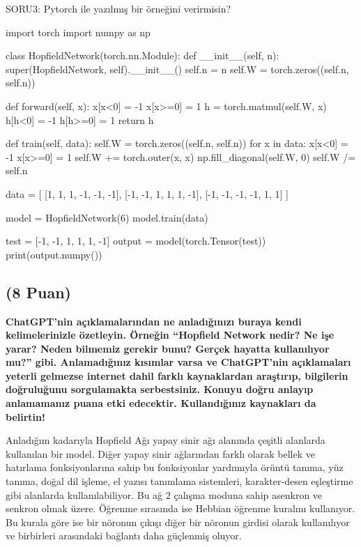 \documentclass[11pt]{article}
\begin{document}
SORU3: Pytorch ile yazılmış bir örneğini verirmisin?

\begin{python}
import torch
import numpy as np

class HopfieldNetwork(torch.nn.Module):
    def __init__(self, n):
        super(HopfieldNetwork, self).__init__()
        self.n = n
        self.W = torch.zeros((self.n, self.n))
        
    def forward(self, x):
        x[x<0] = -1
        x[x>=0] = 1
        h = torch.matmul(self.W, x)
        h[h<0] = -1
        h[h>=0] = 1
        return h
        
    def train(self, data):
        self.W = torch.zeros((self.n, self.n))
        for x in data:
            x[x<0] = -1
            x[x>=0] = 1
            self.W += torch.outer(x, x)
        np.fill_diagonal(self.W, 0)
        self.W /= self.n
        
data = [
    [1, 1, 1, -1, -1, -1],
    [-1, -1, 1, 1, 1, -1],
    [-1, -1, -1, -1, 1, 1]
]

model = HopfieldNetwork(6)
model.train(data)

test = [-1, -1, 1, 1, 1, -1]
output = model(torch.Tensor(test))
print(output.numpy())

\end{python}




\subsection{(8 Puan)} \textbf{ChatGPT’nin açıklamalarından ne anladığınızı buraya kendi kelimelerinizle özetleyin. Örneğin ``Hopfield Network nedir? Ne işe yarar? Neden bilmemiz gerekir bunu? Gerçek hayatta kullanılıyor mu?'' gibi. Anlamadığınız kısımlar varsa ve ChatGPT’nin açıklamaları yeterli gelmezse internet dahil farklı kaynaklardan araştırıp, bilgilerin doğruluğunu sorgulamakta serbestsiniz. Konuyu doğru anlayıp anlamamanız puana etki edecektir. Kullandığınız kaynakları da belirtin!}

Anladığım kadarıyla Hopfield Ağı yapay sinir ağı alanında çeşitli alanlarda kullanılan bir model. Diğer yapay sinir ağlarından farklı olarak bellek ve hatırlama fonksiyonlarına sahip bu fonksiyonlar yardımıyla örüntü tanıma, yüz tanıma, doğal dil işleme, el yazısı tanımlama sistemleri, karakter-desen eşleştirme gibi alanlarda kullanılabiliyor. Bu ağ 2 çalışma moduna sahip asenkron ve senkron olmak üzere.
Öğrenme sırasında ise Hebbian öğrenme kuralını kullanıyor. Bu kurala göre ise bir nöronun çıkışı diğer bir nöronun girdisi olarak kullanılıyor ve birbirleri arasındaki bağlantı daha güçlenmiş oluyor.
\end{document}
